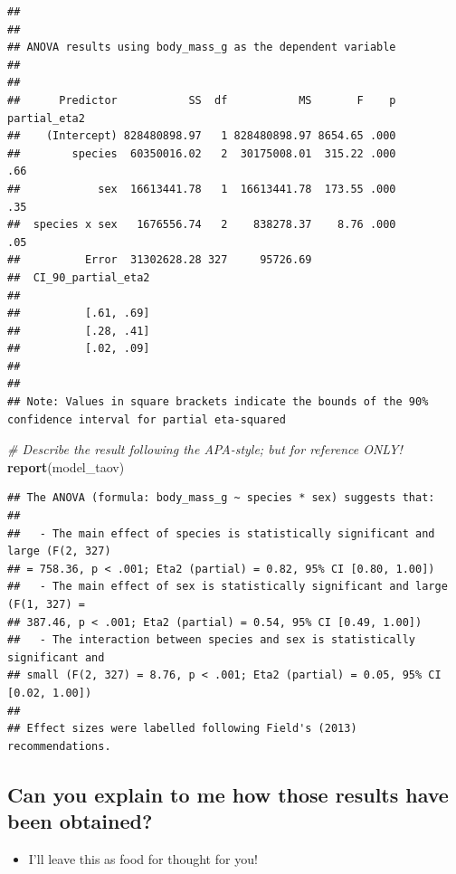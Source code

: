 \documentclass[
]{book}
\newenvironment{Shaded}{\begin{snugshade}}{\end{snugshade}}
\newcommand{\CommentTok}[1]{\textcolor[rgb]{0.56,0.35,0.01}{\textit{#1}}}
\newcommand{\FunctionTok}[1]{\textcolor[rgb]{0.13,0.29,0.53}{\textbf{#1}}}
\newcommand{\NormalTok}[1]{#1}
\providecommand{\tightlist}{%
  \setlength{\itemsep}{0pt}\setlength{\parskip}{0pt}}
\begin{document}
\begin{verbatim}
## 
## 
## ANOVA results using body_mass_g as the dependent variable
##  
## 
##      Predictor           SS  df           MS       F    p partial_eta2
##    (Intercept) 828480898.97   1 828480898.97 8654.65 .000             
##        species  60350016.02   2  30175008.01  315.22 .000          .66
##            sex  16613441.78   1  16613441.78  173.55 .000          .35
##  species x sex   1676556.74   2    838278.37    8.76 .000          .05
##          Error  31302628.28 327     95726.69                          
##  CI_90_partial_eta2
##                    
##          [.61, .69]
##          [.28, .41]
##          [.02, .09]
##                    
## 
## Note: Values in square brackets indicate the bounds of the 90% confidence interval for partial eta-squared
\end{verbatim}

\begin{Shaded}
\begin{Highlighting}[]
\CommentTok{\# Describe the result following the APA{-}style; but for reference ONLY!}
\FunctionTok{report}\NormalTok{(model\_taov)}
\end{Highlighting}
\end{Shaded}

\begin{verbatim}
## The ANOVA (formula: body_mass_g ~ species * sex) suggests that:
## 
##   - The main effect of species is statistically significant and large (F(2, 327)
## = 758.36, p < .001; Eta2 (partial) = 0.82, 95% CI [0.80, 1.00])
##   - The main effect of sex is statistically significant and large (F(1, 327) =
## 387.46, p < .001; Eta2 (partial) = 0.54, 95% CI [0.49, 1.00])
##   - The interaction between species and sex is statistically significant and
## small (F(2, 327) = 8.76, p < .001; Eta2 (partial) = 0.05, 95% CI [0.02, 1.00])
## 
## Effect sizes were labelled following Field's (2013) recommendations.
\end{verbatim}

\subsection{Can you explain to me how those results have been obtained?}\label{can-you-explain-to-me-how-those-results-have-been-obtained-1}

\begin{itemize}
\tightlist
\item
  I'll leave this as food for thought for you!
\end{itemize}
\end{document}
